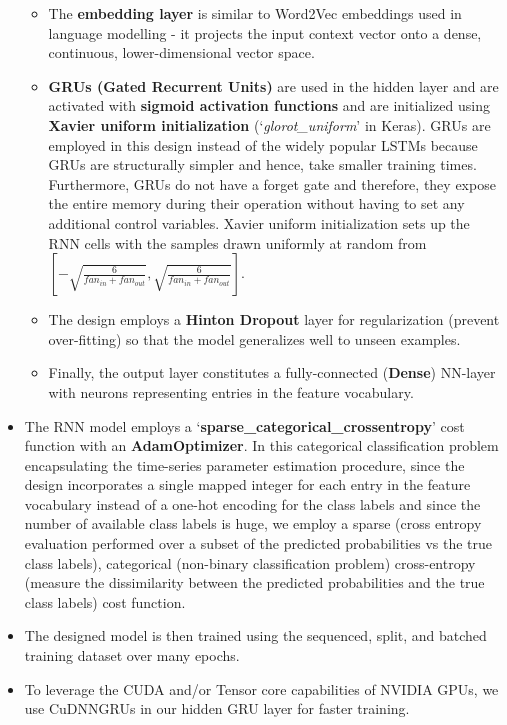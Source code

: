 \documentclass{article}
\begin{document}
\begin{itemize}
\begin{itemize}
        \item The \textbf{embedding layer} is similar to Word2Vec embeddings used in language modelling - it projects the input context vector onto a dense, continuous, lower-dimensional vector space.
        \item \textbf{GRUs (Gated Recurrent Units)} are used in the hidden layer and are activated with \textbf{sigmoid activation functions} and are initialized using \textbf{Xavier uniform initialization} (`\textit{glorot\_uniform}' in Keras). GRUs are employed in this design instead of the widely popular LSTMs because GRUs are structurally simpler and hence, take smaller training times. Furthermore, GRUs do not have a forget gate and therefore, they expose the entire memory during their operation without having to set any additional control variables. Xavier uniform initialization sets up the RNN cells with the samples drawn uniformly at random from $[-\sqrt{\frac{6}{fan_{in} + fan_{out}}}, \sqrt{\frac{6}{fan_{in} + fan_{out}}}]$.
        \item The design employs a \textbf{Hinton Dropout} layer for regularization (prevent over-fitting) so that the model generalizes well to unseen examples.
        \item Finally, the output layer constitutes a fully-connected (\textbf{Dense}) NN-layer with neurons representing entries in the feature vocabulary.
    \end{itemize}
    \item The RNN model employs a `\textbf{sparse\_categorical\_crossentropy}' cost function with an \textbf{AdamOptimizer}. In this categorical classification problem encapsulating the time-series parameter estimation procedure, since the design incorporates a single mapped integer for each entry in the feature vocabulary instead of a one-hot encoding for the class labels and since the number of available class labels is huge, we employ a sparse (cross entropy evaluation performed over a subset of the predicted probabilities vs the true class labels), categorical (non-binary classification problem) cross-entropy (measure the dissimilarity between the predicted probabilities and the true class labels) cost function.
    \item The designed model is then trained using the sequenced, split, and batched training dataset over many epochs.
    \item To leverage the CUDA and/or Tensor core capabilities of NVIDIA GPUs, we use CuDNNGRUs in our hidden GRU layer for faster training.

\end{itemize}
\end{document}
